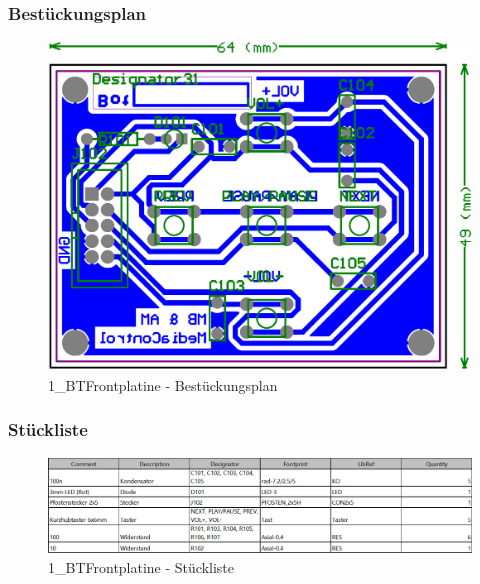 \newpage
\subsubsection*{Bestückungsplan}
\begin{figure} [H]
	\centering
	\includegraphics[width=1\textwidth]{img/BTModul/front_Best.png}
	\caption{1\_BTFrontplatine - Bestückungsplan}
	\label {fig:8.10.5}
\end{figure}
\subsubsection*{Stückliste}
\begin{figure} [H]
	\centering
	\includegraphics[width=1\textwidth]{img/BTModul/front_Blist.png}
	\caption{1\_BTFrontplatine - Stückliste}
	\label {fig:8.10.6}
\end{figure}



